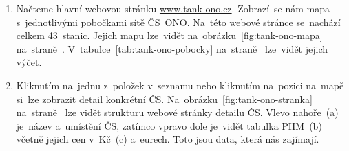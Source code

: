\begin{enumerate}
    \item Načteme hlavní webovou stránku \url{www.tank-ono.cz}. Zobrazí~se
        nám mapa s~jednotlivými pobočkami sítě ČS~ONO. Na~této webové
        stránce se~nachází celkem 43~stanic. Jejich mapu lze~vidět
        na~obrázku~\ref{fig:tank-ono-mapa}
        na~straně~\pageref{fig:tank-ono-mapa}.
        V~tabulce~\ref{tab:tank-ono-pobocky}
        na~straně~\pageref{tab:tank-ono-pobocky} lze~vidět jejich výčet.
    \item Kliknutím na~jednu z~položek v~seznamu nebo kliknutím na~pozici
        na~mapě si~lze zobrazit detail konkrétní ČS.
        Na~obrázku~\ref{fig:tank-ono-stranka}
        na~straně~\pageref{fig:tank-ono-stranka} lze vidět strukturu webové
        stránky detailu ČS. Vlevo nahoře~(a) je~název a~umístění ČS, zatímco
        vpravo dole je~vidět tabulka PHM~(b) včetně jejich cen v~Kč~(c)
        a~eurech. Toto jsou data, která nás zajímají.
\end{enumerate}

